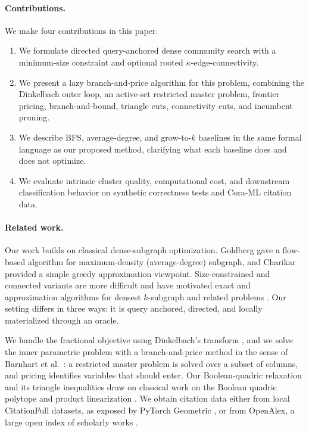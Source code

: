 \documentclass[12pt]{article}
\begin{document}
\paragraph{Contributions.}
We make four contributions in this paper.
\begin{enumerate}[leftmargin=1.1cm,itemsep=2pt]
  \item We formulate directed query-anchored dense community search with a minimum-size constraint and optional rooted $\kappa$-edge-connectivity.
  \item We present a lazy branch-and-price algorithm for this problem, combining the Dinkelbach outer loop, an active-set restricted master problem, frontier pricing, branch-and-bound, triangle cuts, connectivity cuts, and incumbent pruning.
  \item We describe BFS, average-degree, and grow-to-$k$ baselines in the same formal language as our proposed method, clarifying what each baseline does and does not optimize.
  \item We evaluate intrinsic cluster quality, computational cost, and downstream classification behavior on synthetic correctness tests and Cora-ML citation data.
\end{enumerate}

\paragraph{Related work.}
Our work builds on classical dense-subgraph optimization.  Goldberg \cite{goldberg1984} gave a flow-based algorithm for maximum-density (average-degree) subgraph, and Charikar \cite{charikar2000} provided a simple greedy approximation viewpoint.  Size-constrained and connected variants are more difficult and have motivated exact and approximation algorithms for densest $k$-subgraph and related problems \cite{andersen2009,veremyev2017,bonchi2021}.  Our setting differs in three ways: it is query anchored, directed, and locally materialized through an oracle.

We handle the fractional objective using Dinkelbach's transform \cite{dinkelbach1967}, and we solve the inner parametric problem with a branch-and-price method in the sense of Barnhart et al.\ \cite{barnhart1998}: a restricted master problem is solved over a subset of columns, and pricing identifies variables that should enter.  Our Boolean-quadric relaxation and its triangle inequalities draw on classical work on the Boolean quadric polytope \cite{padberg1989} and product linearization \cite{mccormick1976}.  We obtain citation data either from local CitationFull datasets, as exposed by PyTorch Geometric \cite{fey2019,bojchevski2018}, or from OpenAlex, a large open index of scholarly works \cite{priem2022}.
\end{document}
